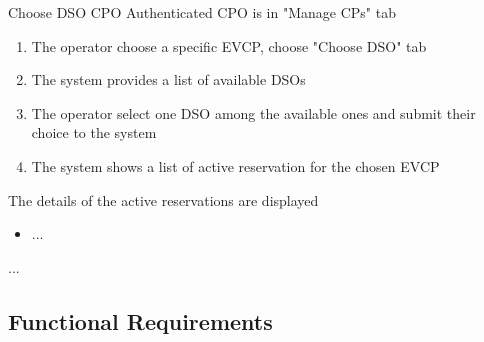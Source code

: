 \usecase
{Choose DSO} %
{CPO} %
{Authenticated CPO is in "Manage CPs" tab} %
{ %
    \begin{enumerate}
        \item The operator choose a specific EVCP, choose "Choose DSO" tab
        \item The system provides a list of available DSOs
        \item The operator select one DSO among the available ones and submit their choice to the system
        \item The system shows a list of active reservation for the chosen EVCP
    \end{enumerate}
}
{The details of the active reservations are displayed} %
{ %
    \begin{itemize}
        \item ...
    \end{itemize}
}
{ %
...
}

\subsection{Functional Requirements}


